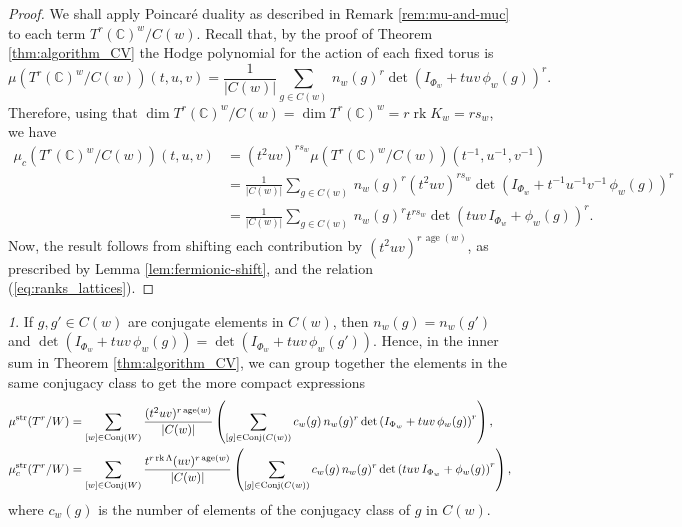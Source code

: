 \documentclass[11pt,english]{amsart}
\numberwithin{equation}{section}
\numberwithin{figure}{section}
\theoremstyle{plain}
\theoremstyle{plain}
\theoremstyle{definition}
\theoremstyle{remark}
\newtheorem{rem}[thm]{\protect\remarkname}
\newcommand{\CC}{\mathbb{C}}
\newcommand{\rk}{\operatorname{rk}}
\newcommand{\age}{\operatorname{age}}
\newcommand{\str}{\textup{str}}
\providecommand{\remarkname}{Remark}
\begin{document}
\begin{proof}
    We shall apply Poincar\'e duality as described in Remark \ref{rem:mu-and-muc} to each term $T^r(\CC)^w/C(w)$. Recall that, by the proof of Theorem \ref{thm:algorithm_CV} the Hodge polynomial for the action of each fixed torus is
    $$
        \mu(T^r(\CC)^w/C(w))(t,u,v) = \frac{1}{|C(w)|}\sum_{g \in C(w)} \, n_{w}(g)^r \det\left(I_{\Phi_w} + tuv\,\phi_w(g)\right)^r.
    $$
    Therefore, using that $\dim T^r(\CC)^w/C(w) = \dim T^r(\CC)^w = r\rk K_w=rs_w$, we have
    \begin{align*}
        \mu_c(T^r(\CC)^w/C(w))(t,u,v) &= (t^2uv)^{rs_w}\mu(T^r(\CC)^w/C(w))(t^{-1},u^{-1},v^{-1}) \\
        &= \frac{1}{|C(w)|}\sum_{g \in C(w)} \, n_{w}(g)^r (t^2uv)^{rs_w}\det\left(I_{\Phi_w} + t^{-1}u^{-1}v^{-1}\,\phi_w(g)\right)^r\\
        &= \frac{1}{|C(w)|}\sum_{g \in C(w)} \, n_{w}(g)^r t^{rs_w}\det\left(tuv\,I_{\Phi_w} + \phi_w(g)\right)^r.
        \end{align*}
    Now, the result follows from shifting each contribution by $(t^2uv)^{r\,\age(w)}$, as prescribed by Lemma \ref{lem:fermionic-shift}, and the relation (\ref{eq:ranks_lattices}). 
\end{proof}

\begin{rem}\label{rem:form-CV-conjugacy-classed}
    If $g,g' \in C(w)$ are conjugate elements in $C(w)$, then $n_{w}(g) = n_{w}(g')$ and \linebreak $\det(I_{\Phi_w}+ tuv\,\phi_w(g)) = \det(I_{\Phi_w}+ tuv\,\phi_w(g'))$. Hence, in the inner sum in Theorem \ref{thm:algorithm_CV}, we can group together the elements in the same conjugacy class to get the more compact expressions
    \begin{align}\label{eq:magic-formula}
    \begin{split}
        \mu^{\str}(T^r/W)&= \sum_{[w] \in \textup{Conj}(W)}
        \frac{(t^2uv)^{r\age(w)}}{|C(w)|} \left(\sum_{[g] \in \textup{Conj}(C(w))} c_{w}(g)\, n_{w}(g)^r \det\left(I_{\Phi_w}+ tuv\,\phi_w(g)\right)^r \right),\\
        \mu^{\str}_c(T^r/W)&= \sum_{[w] \in \textup{Conj}(W)}
        \frac{t^{r \rk \Lambda}(uv)^{r\age(w)}}{|C(w)|} \left(\sum_{[g] \in \textup{Conj}(C(w))} c_{w}(g)\, n_{w}(g)^r \det\left(tuv\,I_{\Phi_w}+ \phi_w(g)\right)^r \right),
    \end{split}
    \end{align}
    where $c_w(g)$ is the number of elements of the conjugacy class of $g$ in $C(w)$.
\end{rem}
\end{document}
